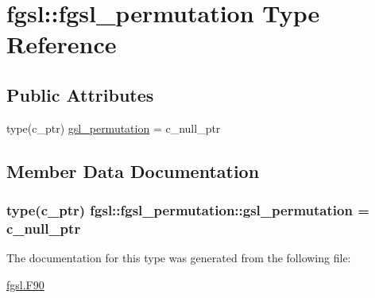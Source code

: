 \hypertarget{structfgsl_1_1fgsl__permutation}{}\section{fgsl\+:\+:fgsl\+\_\+permutation Type Reference}
\label{structfgsl_1_1fgsl__permutation}
\subsection*{Public Attributes}
\begin{DoxyCompactItemize}
\item 
type(c\+\_\+ptr) \hyperlink{structfgsl_1_1fgsl__permutation_a3ebd91ca28e16168ff91b0ccadacb06c}{gsl\+\_\+permutation} = c\+\_\+null\+\_\+ptr
\end{DoxyCompactItemize}


\subsection{Member Data Documentation}
\hypertarget{structfgsl_1_1fgsl__permutation_a3ebd91ca28e16168ff91b0ccadacb06c}{}
\subsubsection[{gsl\+\_\+permutation}]{\setlength{\rightskip}{0pt plus 5cm}type(c\+\_\+ptr) fgsl\+::fgsl\+\_\+permutation\+::gsl\+\_\+permutation = c\+\_\+null\+\_\+ptr}\label{structfgsl_1_1fgsl__permutation_a3ebd91ca28e16168ff91b0ccadacb06c}


The documentation for this type was generated from the following file\+:\begin{DoxyCompactItemize}
\item 
\hyperlink{fgsl_8F90}{fgsl.\+F90}\end{DoxyCompactItemize}
